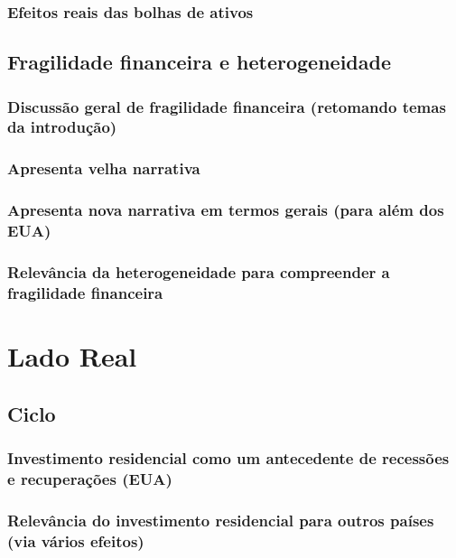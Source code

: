 \documentclass[11pt]{article}
\begin{document}
\subsubsection{Efeitos reais das bolhas de ativos}
\label{sec:org4872d66}

\subsection{Fragilidade financeira e heterogeneidade}
\label{sec:org0f489ac}

\subsubsection{Discussão geral de fragilidade financeira (retomando temas da introdução)}
\label{sec:orgce797bf}

\subsubsection{Apresenta velha narrativa}
\label{sec:org075b2c0}

\subsubsection{Apresenta nova narrativa em termos gerais (para além dos EUA)}
\label{sec:org4f50752}

\subsubsection{Relevância da heterogeneidade para compreender a fragilidade financeira}
\label{sec:orgca41c68}

\section{Lado Real}
\label{sec:org1827220}

\subsection{Ciclo}
\label{sec:orgd6bad89}

\subsubsection{Investimento residencial como um antecedente de recessões e recuperações (EUA)}
\label{sec:orgfa45007}

\subsubsection{Relevância do investimento residencial para outros países (via vários efeitos)}
\label{sec:org8149907}
\end{document}
